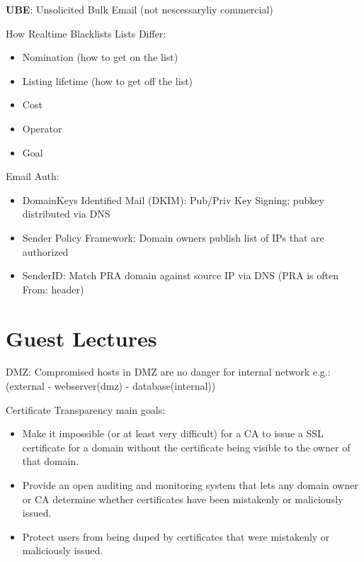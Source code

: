 \documentclass[fs, footer]{latex4ei}
\begin{document}
\begin{multicols*}{4}
\textbf{UBE}: Unsolicited Bulk Email (not nescessaryliy commercial)

How Realtime Blacklists Lists Differ:
\begin{itemize}
	\item Nomination (how to get on the list)
	\item Listing lifetime (how to get off the list)
	\item Cost
	\item Operator
	\item Goal
\end{itemize}

Email Auth:
\begin{itemize}
	\item DomainKeys Identified Mail (DKIM): Pub/Priv Key Signing; pubkey distributed via DNS
	\item Sender Policy Framework: Domain owners publish list of IPs that are authorized
	\item SenderID: Match PRA domain against source IP via DNS (PRA is often From: header)
	\end{itemize}
	
\section{Guest Lectures}
DMZ: Compromised hosts in DMZ are no danger for internal network e.g.:(external - webserver(dmz) - database(internal))

Certificate Transparency  main goals:
\begin{itemize}
	\item Make it impossible (or at least very difficult) for a CA to issue a SSL certificate for a domain without the certificate being visible to the owner of that domain.
	\item Provide an open auditing and monitoring system that lets any domain owner or CA determine whether certificates have been mistakenly or maliciously issued.
	\item Protect users from being duped by certificates that were mistakenly or maliciously issued.
\end{itemize}

\end{multicols*}

\end{document}
